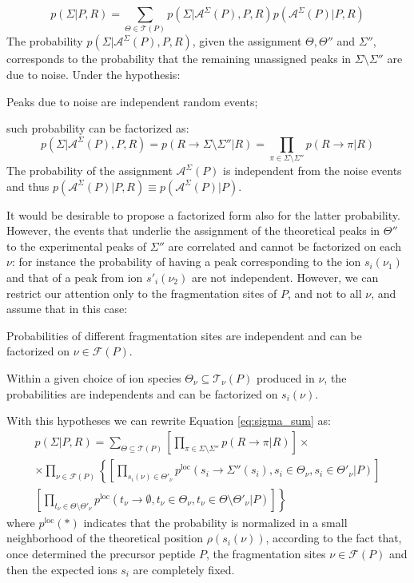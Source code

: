 \begin{equation}
p(\Sigma|P,R)=
\sum_{\Theta\in\mathcal T(P)}
p(\Sigma|\mathcal A^\Sigma(P),P,R)p(\mathcal A^\Sigma(P)|P,R)
\label{eq:sigma_sum}
\end{equation}
The probability $p(\Sigma|\mathcal A^\Sigma(P),P,R)$, given the assignment
$\Theta,\Theta''$ and $\Sigma''$, corresponds to the probability that
the remaining unassigned peaks in $\Sigma\setminus\Sigma''$ are due
to noise. Under the hypothesis:
\begin{hypothesis}
Peaks due to noise are independent random events;
\label{hyp:indipR}
\end{hypothesis}
such probability can be factorized as:
\begin{equation}
p(\Sigma|\mathcal A^\Sigma(P),P,R)=
p(R\to\Sigma\setminus\Sigma''|R)=
\prod_{\pi\in\Sigma\setminus\Sigma''}
p(R\to\pi|R)
\end{equation}
The probability of the assignment
$\mathcal A^\Sigma(P)$ is independent from the noise events and thus $p(\mathcal
A^\Sigma (P)|P,R)\equiv p(\mathcal A^\Sigma(P)|P)$.

It would be desirable to propose a factorized form also for the latter probability. 
However, the events that underlie the assignment of the theoretical peaks in
$\Theta''$ to the experimental peaks of $\Sigma''$ are correlated and cannot be
factorized on each $\nu$: for instance the probability of having a peak
corresponding to the ion $s_i(\nu_1)$ and that of a peak from ion $s'_i(\nu_2)$
are not independent. However, we can restrict our attention only to the
fragmentation sites of $P$, and not to all $\nu$, and assume that in this case:
\begin{hypothesis}
Probabilities of different fragmentation sites are independent and can be
factorized on $\nu\in\mathcal F(P)$.
\end{hypothesis}
\begin{hypothesis}
Within a given choice of ion species $\Theta_\nu\subseteq\mathcal T_\nu(P)$
produced in $\nu$, the probabilities are independents and can be factorized on
$s_i(\nu)$.
\end{hypothesis}

With this hypotheses we can rewrite Equation \ref{eq:sigma_sum} as:
\begin{multline}
p(\Sigma|P,R)=
\sum_{\Theta\subseteq\mathcal T(P)}
\left[
\prod_{\pi\in\Sigma\setminus\Sigma''}
p(R\to\pi|R)
\right]\times\\
\times\prod_{\nu\in\mathcal F(P)}
\left\{
\left[
\prod_{s_i(\nu)\in\Theta'_\nu}
p^\text{loc}(s_i\to\Sigma''(s_i),s_i\in\Theta_\nu,s_i\in\Theta'_\nu|P)
\right]
\right.\\
\left.
\left[
\prod_{t_\nu\in\Theta\setminus\Theta'_\nu}
p^\text{loc}(t_\nu\to\emptyset,t_\nu\in\Theta_\nu,t_\nu\in\Theta\setminus\Theta'_\nu|P)
\right]
\right\}
\end{multline}
where $p^\text{loc}(*)$ indicates that the probability is normalized in a small
neighborhood of the theoretical position $\rho(s_i(\nu))$, according
to the fact that, once determined the precursor peptide $P$, the fragmentation
sites $\nu\in\mathcal F(P)$ and then the expected ions $s_i$ are completely
fixed. 

